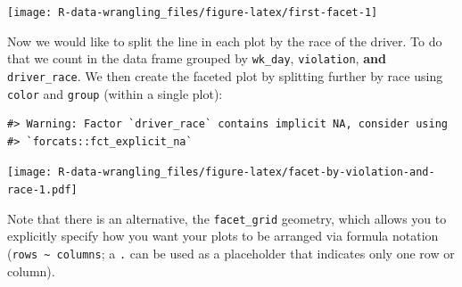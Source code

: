\documentclass[]{book}
\newenvironment{Shaded}{\begin{snugshade}}{\end{snugshade}}
\newcommand{\CommentTok}[1]{\textcolor[rgb]{0.56,0.35,0.01}{\textit{#1}}}
\newcommand{\DataTypeTok}[1]{\textcolor[rgb]{0.13,0.29,0.53}{#1}}
\newcommand{\KeywordTok}[1]{\textcolor[rgb]{0.13,0.29,0.53}{\textbf{#1}}}
\newcommand{\NormalTok}[1]{#1}
\newcommand{\OperatorTok}[1]{\textcolor[rgb]{0.81,0.36,0.00}{\textbf{#1}}}
\newcommand{\StringTok}[1]{\textcolor[rgb]{0.31,0.60,0.02}{#1}}
\begin{document}
\begin{Shaded}
\end{Shaded}

\texttt{[image: R-data-wrangling\_files/figure-latex/first-facet-1]}

Now we would like to split the line in each plot by the race of the driver. To do that we count in the data frame grouped by \texttt{wk\_day}, \texttt{violation}, \textbf{and} \texttt{driver\_race}. We then create the faceted plot by splitting further by race using \texttt{color} and \texttt{group} (within a single plot):

\begin{Shaded}
\end{Shaded}

\begin{verbatim}
#> Warning: Factor `driver_race` contains implicit NA, consider using
#> `forcats::fct_explicit_na`
\end{verbatim}

\texttt{[image: R-data-wrangling\_files/figure-latex/facet-by-violation-and-race-1.pdf]}

Note that there is an alternative, the \texttt{facet\_grid} geometry, which allows you to explicitly specify how you want your plots to be
arranged via formula notation (\texttt{rows\ \textasciitilde{}\ columns}; a \texttt{.} can be used as
a placeholder that indicates only one row or column).
\end{document}
